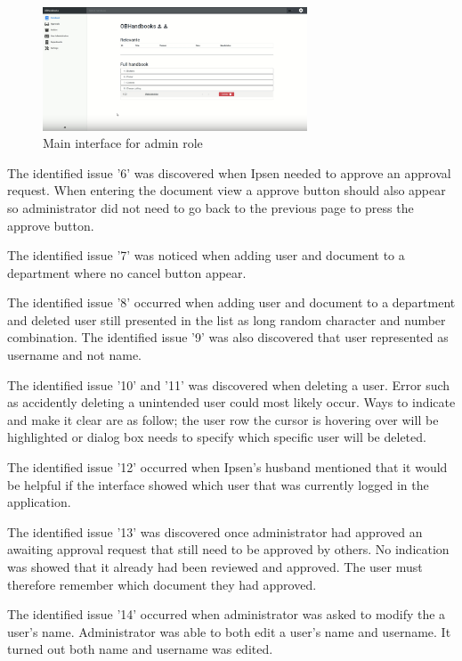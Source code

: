 \begin{figure}[H]
	\centering
		\includegraphics[width=0.7\textwidth]{billeder/MainInterfaceAdmin.png}
	\caption{Main interface for admin role}\label{fig:MainInterfaceAdmin}
\end{figure}

The identified issue '6' was discovered when Ipsen needed to approve an approval request.  
When entering the document view a approve button should also appear so administrator did not need to go back to the previous page to press the approve button. 

The identified issue '7' was noticed when adding user and document to a department where no cancel button appear. 

The identified issue '8' occurred when adding user and document to a department and deleted user still presented in the list as long random character and number combination. The identified issue '9' was also discovered that user represented as username and not name. 

The identified issue '10'  and '11' was discovered when deleting a user.
Error such as accidently deleting a unintended user could most likely occur.  
Ways to indicate and make it clear are as follow; the user row the cursor is hovering over will be highlighted or dialog box needs to specify which specific user will be deleted.  

The identified issue '12' occurred when Ipsen's husband mentioned that it would be helpful if the interface showed which user that was currently logged in the application. 

The identified issue '13' was discovered once administrator had approved an awaiting approval request that still need to be approved by others. 
No indication was showed that it already had been reviewed and approved.
The user must therefore remember which document they had approved. 

The identified issue '14' occurred when administrator was asked to modify the a user's name. 
Administrator was able to both edit a user's name and username. 
It turned out both name and username was edited. 

